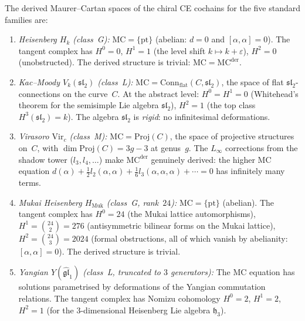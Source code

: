 \begin{proposition}
\label{prop:mc-five-families}
The derived Maurer--Cartan spaces of the chiral CE cochains for the five standard families are:
\begin{enumerate}[label=\textup{(\roman*)}]
 \item \emph{Heisenberg $H_k$ (class~G):} $\mathrm{MC} = \{\mathrm{pt}\}$ (abelian: $d = 0$ and $[\alpha, \alpha] = 0$). The tangent complex has $H^0 = 0$, $H^1 = 1$ (the level shift $k \mapsto k + \varepsilon$), $H^2 = 0$ (unobstructed). The derived structure is trivial: $\mathrm{MC} = \mathrm{MC}^{\mathrm{der}}$.
 \item \emph{Kac--Moody $V_k(\mathfrak{sl}_2)$ (class~L):} $\mathrm{MC} = \mathrm{Conn}_{\mathrm{flat}}(C, \mathfrak{sl}_2)$, the space of flat $\mathfrak{sl}_2$-connections on the curve~$C$. At the abstract level: $H^0 = H^1 = 0$ (Whitehead's theorem for the semisimple Lie algebra $\mathfrak{sl}_2$), $H^2 = 1$ (the top class $H^3(\mathfrak{sl}_2) = k$). The algebra $\mathfrak{sl}_2$ is \emph{rigid}: no infinitesimal deformations.
 \item \emph{Virasoro $\mathrm{Vir}_c$ (class~M):} $\mathrm{MC} = \mathrm{Proj}(C)$, the space of projective structures on~$C$, with $\dim \mathrm{Proj}(C) = 3g - 3$ at genus~$g$. The $L_\infty$ corrections from the shadow tower ($l_3, l_4, \ldots$) make $\mathrm{MC}^{\mathrm{der}}$ genuinely derived: the higher MC equation $d(\alpha) + \tfrac{1}{2}l_2(\alpha, \alpha) + \tfrac{1}{6}l_3(\alpha, \alpha, \alpha) + \cdots = 0$ has infinitely many terms.
 \item \emph{Mukai Heisenberg $H_{\mathrm{Muk}}$ (class~G, rank~$24$):} $\mathrm{MC} = \{\mathrm{pt}\}$ (abelian). The tangent complex has $H^0 = 24$ (the Mukai lattice automorphisms), $H^1 = \binom{24}{2} = 276$ (antisymmetric bilinear forms on the Mukai lattice), $H^2 = \binom{24}{3} = 2024$ (formal obstructions, all of which vanish by abelianity: $[\alpha,\alpha] = 0$). The derived structure is trivial.
 \item \emph{Yangian $Y(\widehat{\mathfrak{gl}}_1)$ (class~L, truncated to $3$ generators):} The MC equation has solutions parametrised by deformations of the Yangian commutation relations. The tangent complex has Nomizu cohomology $H^0 = 2$, $H^1 = 2$, $H^2 = 1$ (for the $3$-dimensional Heisenberg Lie algebra $\mathfrak{h}_3$).
\end{enumerate}
\end{proposition}

